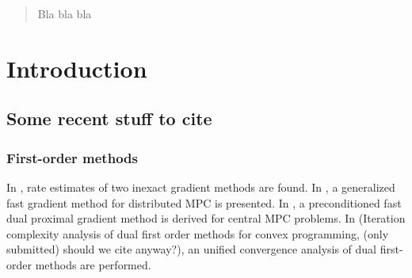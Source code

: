 
\author{Emil Klintberg         \and
        Sebastien Gros %
}



\date{Received: date / Accepted: date}


\maketitle

\begin{abstract}
Bla bla bla
\end{abstract}

\section{Introduction}

\subsection{Some recent stuff to cite}

\subsubsection{First-order methods} 
In \cite{Necoara2014a}, rate estimates of two inexact gradient methods are found. In \cite{Giselsson2014a}, a generalized fast gradient method for distributed MPC is presented. In \cite{Giselsson2014b}, a preconditioned fast dual proximal gradient method is derived for central MPC problems. In (Iteration complexity analysis of dual first order methods for convex programming, (only submitted) should we cite anyway?), an unified convergence analysis of dual first-order methods are performed.

